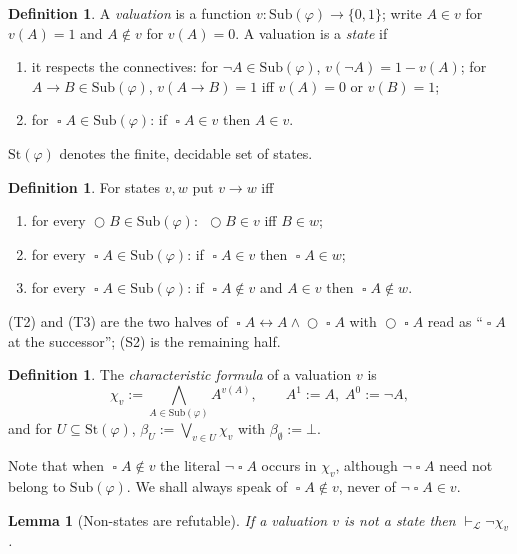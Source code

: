 \documentclass[11pt,a4paper]{article}
\newtheorem{lemma}[theorem]{Lemma}
\theoremstyle{definition}
\newtheorem{definition}[theorem]{Definition}
\newcommand{\Next}{\mathop{\bigcirc}}
\newcommand{\Always}{\mathop{\square}}
\newcommand{\Sub}{\mathrm{Sub}}
\newcommand{\St}{\mathrm{St}}
\newcommand{\proves}{\vdash_{\mathcal{L}}}
\begin{document}
\begin{definition}
A \emph{valuation} is a function $v:\Sub(\varphi)\to\{0,1\}$; write $A\in v$ for
$v(A)=1$ and $A\notin v$ for $v(A)=0$.  A valuation is a \emph{state} if
\begin{enumerate}
\item[(S1)] it respects the connectives: for $\neg A\in\Sub(\varphi)$,
  $v(\neg A)=1-v(A)$; for $A\to B\in\Sub(\varphi)$, $v(A\to B)=1$ iff $v(A)=0$
  or $v(B)=1$;
\item[(S2)] for $\Always A\in\Sub(\varphi)$: if $\Always A\in v$ then $A\in v$.
\end{enumerate}
$\St(\varphi)$ denotes the finite, decidable set of states.
\end{definition}

\begin{definition}\label{def:trans}
For states $v,w$ put $v\to w$ iff
\begin{enumerate}
\item[(T1)] for every $\Next B\in\Sub(\varphi)$: $\;\Next B\in v$ iff $B\in w$;
\item[(T2)] for every $\Always A\in\Sub(\varphi)$: if $\Always A\in v$ then
  $\Always A\in w$;
\item[(T3)] for every $\Always A\in\Sub(\varphi)$: if $\Always A\notin v$ and
  $A\in v$ then $\Always A\notin w$.
\end{enumerate}
\end{definition}

(T2) and (T3) are the two halves of $\Always A\leftrightarrow A\wedge\Next\Always A$
with $\Next\Always A$ read as ``$\Always A$ at the successor''; (S2) is the
remaining half.

\begin{definition}
The \emph{characteristic formula} of a valuation $v$ is
\[
  \chi_v:=\bigwedge_{A\in\Sub(\varphi)}A^{v(A)},\qquad A^1:=A,\; A^0:=\neg A,
\]
and for $U\subseteq\St(\varphi)$, $\beta_U:=\bigvee_{v\in U}\chi_v$ with
$\beta_\emptyset:=\bot$.
\end{definition}

Note that when $\Always A\notin v$ the literal $\neg\Always A$ occurs in
$\chi_v$, although $\neg\Always A$ need not belong to $\Sub(\varphi)$.  We shall
always speak of $\Always A\notin v$, never of $\neg\Always A\in v$.

\begin{lemma}[Non-states are refutable]\label{lem:nonstate}
If a valuation $v$ is not a state then $\proves\neg\chi_v$.
\end{lemma}
\end{document}
